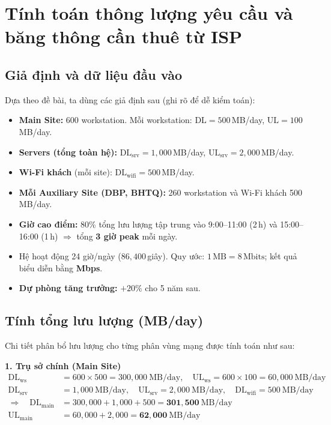 \setcounter{section}{2}
\section{Tính toán thông lượng yêu cầu và băng thông cần thuê từ ISP}

\subsection{Giả định và dữ liệu đầu vào}

Dựa theo đề bài, ta dùng các giả định sau (ghi rõ để dễ kiểm toán):
\begin{itemize}[leftmargin=*, itemsep=2pt]
  \item \textbf{Main Site:} 600 workstation. Mỗi workstation: $\mathrm{DL} = 500$\,MB/day, $\mathrm{UL} = 100$\,MB/day.
  \item \textbf{Servers (tổng toàn hệ):} $\mathrm{DL_{srv}} = 1{,}000$\,MB/day, $\mathrm{UL_{srv}} = 2{,}000$\,MB/day.
  \item \textbf{Wi-Fi khách} (mỗi site): $\mathrm{DL_{wifi}} = 500$\,MB/day.
  \item \textbf{Mỗi Auxiliary Site (DBP, BHTQ):} 260 workstation và Wi-Fi khách 500\,MB/day.
  \item \textbf{Giờ cao điểm:} 80\% tổng lưu lượng tập trung vào 9:00--11:00 (2\,h) và 15:00--16:00 (1\,h) $\Rightarrow$ tổng \textbf{3 giờ peak} mỗi ngày.
  \item Hệ hoạt động 24 giờ/ngày ($86{,}400$\,giây). Quy ước: $1\,\text{MB} = 8\,\text{Mbits}$; kết quả biểu diễn bằng \textbf{Mbps}.
  \item \textbf{Dự phòng tăng trưởng:} $+20\%$ cho 5 năm sau.
\end{itemize}

\subsection{Tính tổng lưu lượng (MB/day)}
Chi tiết phân bổ lưu lượng cho từng phân vùng mạng được tính toán như sau:

\vspace{0.2cm}
\noindent \textbf{1. Trụ sở chính (Main Site)}
\vspace{-0.4cm}
\begin{align*}
  \mathrm{DL_{ws}} &= 600 \times 500 = 300{,}000\ \text{MB/day}, \quad \mathrm{UL_{ws}} = 600 \times 100 = 60{,}000\ \text{MB/day} \\
  \mathrm{DL_{srv}} &= 1{,}000\ \text{MB/day}, \quad \mathrm{UL_{srv}} = 2{,}000\ \text{MB/day}, \quad \mathrm{DL_{wifi}} = 500\ \text{MB/day} \\
  \Rightarrow\quad \mathrm{DL_{main}} &= 300{,}000 + 1{,}000 + 500 = \mathbf{301{,}500}\ \text{MB/day} \\
  \mathrm{UL_{main}} &= 60{,}000 + 2{,}000 = \mathbf{62{,}000}\ \text{MB/day}
\end{align*}

